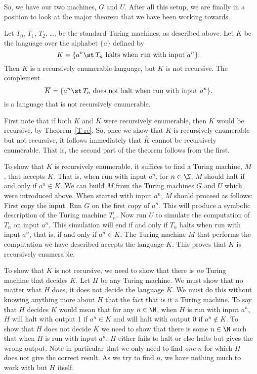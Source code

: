 So, we have our two machines, $G$ and $U$.
After all this setup, we are finally in a position to look at
the major theorem that we have been working towards.

\begin{theorem}
Let $T_0$, $T_1$, $T_2$, \dots, be the standard Turing machines,
as described above.  Let $K$ be the language over the alphabet $\{a\}$
defined by $$K=\{a^n\st\,T_n\text{ halts when run with input }a^n\}.$$
Then $K$ is a recursively enumerable language, but $K$ is not
recursive.  The complement $$\overline{K}=\{a^n\st\,T_n\text{ does
not halt when run with input }a^n\}.$$
is a language that is not recursively enumerable.
\end{theorem}

First note that if both $K$ and $\overline{K}$ were recursively
enumerable, then $K$ would be recursive, by Theorem~\ref{T-re}.
So, once we show that $K$ is recursively enumerable but not
recursive, it follows immediately that $\overline{K}$ cannot
be recursively enumerable.  That is, the second part of the
theorem follows from the first.

To show that $K$ is recursively enumerable, it suffices to find
a Turing machine, $M$, that accepts $K$.  That is, when run
with input $a^n$, for $n\in\N$, $M$ should halt if and only if
$a^n\in K$.  We can build $M$ from the Turing machines $G$ and $U$
which were introduced above.  When started with input $a^n$, 
$M$ should proceed as follows:  
First copy the input.  Run $G$ on the
first copy of $a^n$.  This will produce a symbolic description
of the Turing machine $T_n$.  Now run $U$ to simulate the 
computation of $T_n$ on input $a^n$.  This simulation will end
if and only if $T_n$ halts when run with input $a^n$, that is, if and only
if $a^n\in K$.  The Turing machine $M$ that performs the computation
we have described accepts the language $K$.
This proves that $K$ is recursively enumerable.

To show that $K$ is not recursive, we need to show that
there is \textit{no} Turing machine that decides $K$.  
Let $H$ be any Turing machine.  We must show that
no matter what $H$ does, it
does not decide the language $K$.  We must do this without
knowing anything more about $H$ that the fact that is it
a Turing machine.  To say that $H$ decides
$K$ would mean that for any $n\in\N$, when $H$ is
run with input $a^n$, $H$ will halt with output 1 if $a^n\in K$
and will halt with output 0 if $a^n\not\in K$.  To show that
$H$ does not decide $K$ we need to show that there is some
$n\in\N$ such that when $H$ is run with input $a^n$, 
$H$ either fails to halt or else halts but gives the wrong 
output.  Note in particular that we only need to find \textit{one}
$n$ for which $H$ does not give the correct result.
As we try to find $n$, we have nothing much to work with
but $H$ itself.

